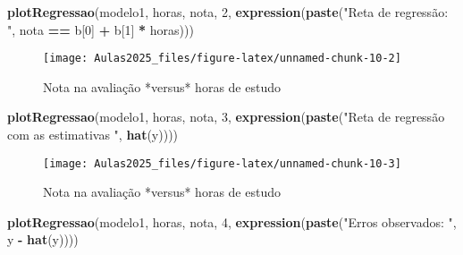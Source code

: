 \documentclass[
]{book}
\newenvironment{Shaded}{\begin{snugshade}}{\end{snugshade}}
\newcommand{\DecValTok}[1]{\textcolor[rgb]{0.00,0.00,0.81}{#1}}
\newcommand{\FunctionTok}[1]{\textcolor[rgb]{0.13,0.29,0.53}{\textbf{#1}}}
\newcommand{\NormalTok}[1]{#1}
\newcommand{\SpecialCharTok}[1]{\textcolor[rgb]{0.81,0.36,0.00}{\textbf{#1}}}
\newcommand{\StringTok}[1]{\textcolor[rgb]{0.31,0.60,0.02}{#1}}
\begin{document}
\begin{Shaded}
\begin{Highlighting}[]
\FunctionTok{plotRegressao}\NormalTok{(modelo1, horas, nota, }\DecValTok{2}\NormalTok{, }\FunctionTok{expression}\NormalTok{(}\FunctionTok{paste}\NormalTok{(}\StringTok{"Reta de regressão: "}\NormalTok{,}
\NormalTok{    nota }\SpecialCharTok{==}\NormalTok{ b[}\DecValTok{0}\NormalTok{] }\SpecialCharTok{+}\NormalTok{ b[}\DecValTok{1}\NormalTok{] }\SpecialCharTok{*}\NormalTok{ horas)))}
\end{Highlighting}
\end{Shaded}

\begin{figure}

{\centering \texttt{[image: Aulas2025\_files/figure-latex/unnamed-chunk-10-2]} 

}

\caption{Nota na avaliação *versus* horas de estudo}\label{fig:unnamed-chunk-10-2}
\end{figure}

\begin{Shaded}
\begin{Highlighting}[]
\FunctionTok{plotRegressao}\NormalTok{(modelo1, horas, nota, }\DecValTok{3}\NormalTok{, }\FunctionTok{expression}\NormalTok{(}\FunctionTok{paste}\NormalTok{(}\StringTok{"Reta de regressão com as estimativas "}\NormalTok{,}
    \FunctionTok{hat}\NormalTok{(y))))}
\end{Highlighting}
\end{Shaded}

\begin{figure}

{\centering \texttt{[image: Aulas2025\_files/figure-latex/unnamed-chunk-10-3]} 

}

\caption{Nota na avaliação *versus* horas de estudo}\label{fig:unnamed-chunk-10-3}
\end{figure}

\begin{Shaded}
\begin{Highlighting}[]
\FunctionTok{plotRegressao}\NormalTok{(modelo1, horas, nota, }\DecValTok{4}\NormalTok{, }\FunctionTok{expression}\NormalTok{(}\FunctionTok{paste}\NormalTok{(}\StringTok{"Erros observados: "}\NormalTok{,}
\NormalTok{    y }\SpecialCharTok{{-}} \FunctionTok{hat}\NormalTok{(y))))}
\end{Highlighting}
\end{Shaded}
\end{document}
